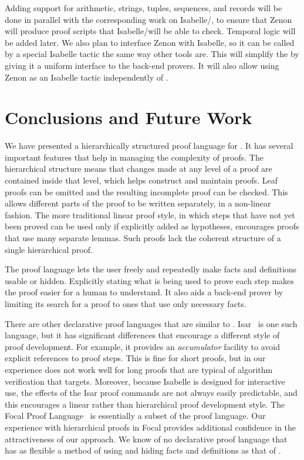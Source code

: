\documentclass[a4paper]{easychair}
\begin{document}
Adding support for arithmetic, strings, tuples, sequences, and records
will be done in parallel with the corresponding work on
Isabelle/\tlaplus, to ensure that Zenon will produce proof scripts
that Isabelle/\tlaplus will be able to check. Temporal logic will be
added later.
We also plan to interface Zenon with Isabelle, so it can be called by
a special Isabelle tactic the same way other tools are.  This will
simplify the \PM by giving it a uniform interface to the back-end
provers.  It will also allow using Zenon as an Isabelle tactic
independently of \tlaplus.

\section{Conclusions and Future Work}
\label{sec:conclusions}

We have presented a hierarchically structured proof language for
\tlaplus.  It has several important features that help in managing the
complexity of proofs.  The hierarchical structure means that changes
made at any level of a proof are contained inside that level, which
helps construct and maintain proofs.  Leaf proofs can be omitted and
the resulting incomplete proof can be checked.  This allows different parts
of the proof to be written separately, in a non-linear fashion.
The more traditional linear proof style, in which steps that have not
yet been proved can be used only if explicitly added as hypotheses,
encourages proofs that use many separate lemmas.  Such proofs lack the
coherent structure of a single hierarchical proof.

The proof language lets the user freely and repeatedly make facts and
definitions usable or hidden.  Explicitly stating what is being used
to prove each step makes the proof easier for a human to understand.
It also aids a back-end prover by limiting its search for a proof
to ones that use only necessary facts.

There are other declarative proof languages that are similar to
\tlatwo. Isar~\cite{isar} is one such language, but it has significant
differences that encourage a different style of proof development.
For example, 
it provides an \emph{accumulator} facility to avoid explicit
references to proof steps.  This is fine for short proofs, but in
our experience does not work well for long proofs that are typical of
algorithm verification that \tlatwo{} targets.
Moreover, because Isabelle is designed for interactive use, the
effects of the Isar proof commands are not always easily predictable, and
this encourages a linear rather than hierarchical proof development
style.
\nocite{rudnicki:mizar}The Focal Proof Language~\cite{focal} is essentially a subset of the
\tlatwo proof language.  Our experience with hierarchical proofs in
Focal provides additional confidence in the attractiveness of our
approach.  We know of no declarative proof language that has as
flexible a method of using and hiding facts and definitions as that of
\tlatwo.
\end{document}

